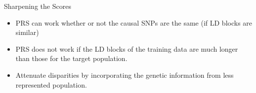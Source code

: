 \documentclass{beamer}
\begin{document}
\begin{frame}{Sharpening the Scores}

    \begin{itemize}
        \item PRS can work whether or not the causal SNPs are the same (if LD blocks are similar)
        \item PRS does not work if the LD blocks of the training data are much longer than those for the target population.
        \item Attenuate disparities by incorporating the genetic information from less represented population.
    \end{itemize}
    


\end{frame}
\end{document}
